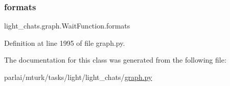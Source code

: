 \subsubsection{\texorpdfstring{formats}{formats}}
{\footnotesize\ttfamily light\+\_\+chats.\+graph.\+Wait\+Function.\+formats}



Definition at line 1995 of file graph.\+py.



The documentation for this class was generated from the following file\+:\begin{DoxyCompactItemize}
\item 
parlai/mturk/tasks/light/light\+\_\+chats/\hyperlink{parlai_2mturk_2tasks_2light_2light__chats_2graph_8py}{graph.\+py}\end{DoxyCompactItemize}
